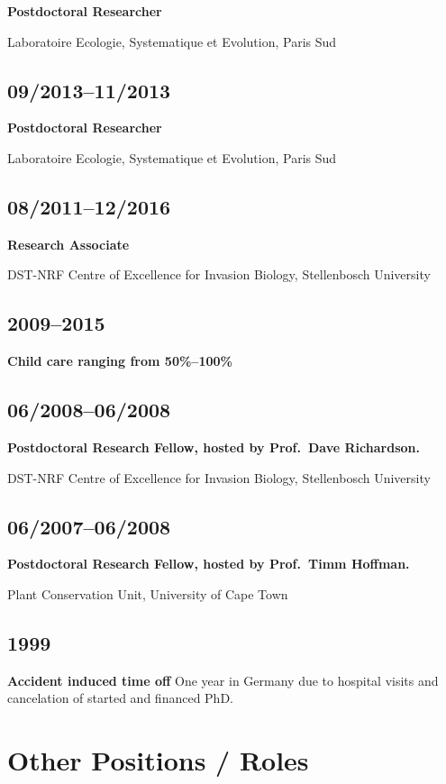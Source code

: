 \documentclass[a4paper]{article}
\begin{document}
\textbf{Postdoctoral Researcher} 

Laboratoire Ecologie, Systematique et Evolution, Paris Sud

\subsection{09/2013--11/2013}

\textbf{Postdoctoral Researcher}

Laboratoire Ecologie, Systematique et Evolution, Paris Sud

\subsection{08/2011--12/2016}

\textbf{Research Associate}

DST-NRF Centre of Excellence for Invasion Biology, Stellenbosch University

\subsection{2009--2015 }

\textbf{Child care ranging from 50\%--100\%}


\subsection{06/2008--06/2008}

\textbf{Postdoctoral Research Fellow, hosted by Prof.\ Dave Richardson.}

DST-NRF Centre of Excellence for Invasion Biology, Stellenbosch University

\subsection{06/2007--06/2008}

\textbf{Postdoctoral Research Fellow, hosted by Prof.\ Timm Hoffman.} 

Plant Conservation Unit, University of Cape Town

\subsection{1999}
\textbf{Accident induced time off}
One year in Germany due to hospital visits and cancelation of started and 
	financed PhD.

\section{Other Positions / Roles}
\end{document}
